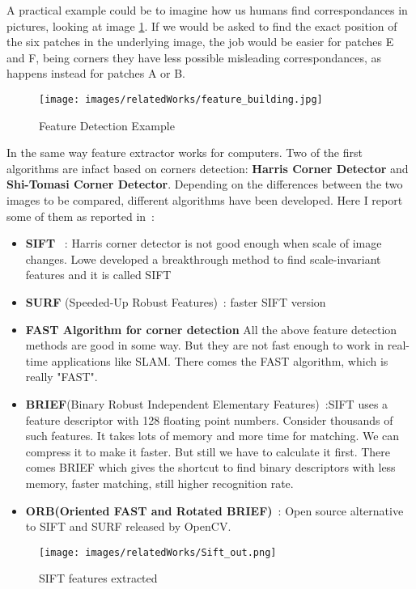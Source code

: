  A practical example could be to imagine how us humans find correspondances in pictures, looking at image
 \ref{fig:sfm_opencv}. If we would be asked to find the exact position of the six patches in the underlying image,
the job would be easier for patches E and F, being corners they have less possible misleading correspondances, as happens
instead for patches A or B.
 \begin{figure}[H]
    \centering
    \texttt{[image: images/relatedWorks/feature\_building.jpg]} %
    \caption{Feature Detection Example \cite{open_cv}}
    \label{fig:sfm_opencv}
\end{figure}

In the same way feature extractor works for computers. Two of the first algorithms are infact based on corners detection: 
\textbf{Harris Corner Detector} and \textbf{Shi-Tomasi Corner Detector}.
Depending on the differences between the two images to be compared, different algorithms have been developed. Here I report 
some of them as reported in~\cite{open_cv}:
\begin{itemize}
    \item \textbf{SIFT} ~\cite{Lowe04_SIFT}: Harris corner detector is not good enough when scale of image changes. Lowe developed a breakthrough 
    method to find scale-invariant features and it is called SIFT
    \item \textbf{SURF} (Speeded-Up Robust Features)~\cite{BAY_SURF}: faster SIFT version
    \item \textbf{FAST Algorithm for corner detection} All the above feature detection methods are good in some way. But they 
    are not fast enough to work in real-time applications like SLAM. There comes the FAST algorithm, which is really "FAST".
    \item \textbf{BRIEF}(Binary Robust Independent Elementary Features)~\cite{Brief}:SIFT uses a feature descriptor with 128 floating point numbers.
     Consider thousands of such features. It takes lots of memory and more time for matching. We can compress it to make it
    faster. But still we have to calculate it first. There comes BRIEF which gives the shortcut to find binary descriptors with less memory, faster matching, still higher recognition rate.
    \item \textbf{ORB(Oriented FAST and Rotated BRIEF)}~\cite{ORB}: Open source alternative to SIFT and SURF released by OpenCV.
\end{itemize}
\begin{figure}
    \centerline{
    \texttt{[image: images/relatedWorks/Sift\_out.png]}} %
    \caption{SIFT features extracted}
    \label{fig:sift}
\end{figure}

